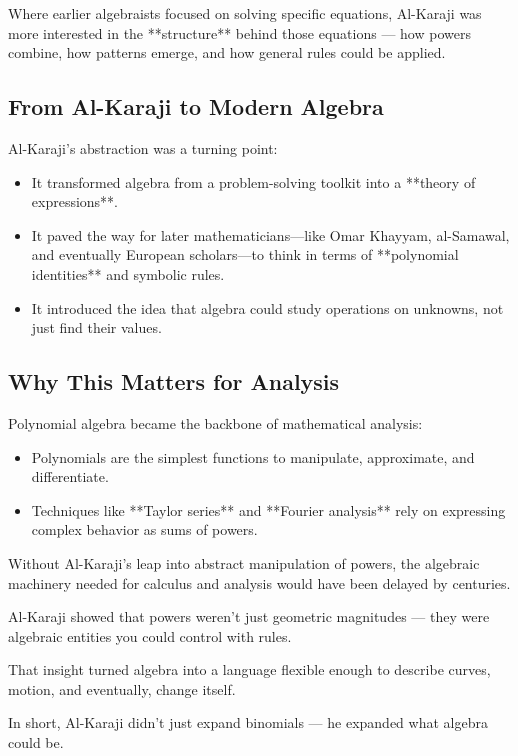 \begin{tcolorbox}[colback=blue!5!white, colframe=blue!50!black, title={Historical Sidebar: Al-Karaji and the Birth of Polynomial Algebra}, breakable]
    Where earlier algebraists focused on solving specific equations, Al-Karaji was more interested in the **structure** behind those equations — how powers combine, how patterns emerge, and how general rules could be applied.
    
    \subsection*{From Al-Karaji to Modern Algebra}
    
    Al-Karaji’s abstraction was a turning point:
    
    \begin{itemize}
      \item It transformed algebra from a problem-solving toolkit into a **theory of expressions**.
      \item It paved the way for later mathematicians—like Omar Khayyam, al-Samawal, and eventually European scholars—to think in terms of **polynomial identities** and symbolic rules.
      \item It introduced the idea that algebra could study operations on unknowns, not just find their values.
    \end{itemize}
    
    \subsection*{Why This Matters for Analysis}
    
    Polynomial algebra became the backbone of mathematical analysis:
    
    \begin{itemize}
      \item Polynomials are the simplest functions to manipulate, approximate, and differentiate.
      \item Techniques like **Taylor series** and **Fourier analysis** rely on expressing complex behavior as sums of powers.
    \end{itemize}
    
    Without Al-Karaji’s leap into abstract manipulation of powers, the algebraic machinery needed for calculus and analysis would have been delayed by centuries.
    
    \begin{tcolorbox}[colback=gray!10, colframe=black, title={From Al-Karaji’s Powers to Newton’s Calculus}, fonttitle=\bfseries]
    Al-Karaji showed that powers weren’t just geometric magnitudes — they were algebraic entities you could control with rules.
    
    That insight turned algebra into a language flexible enough to describe curves, motion, and eventually, change itself.
    \end{tcolorbox}
    
    In short, Al-Karaji didn’t just expand binomials — he expanded what algebra could be.
    
\end{tcolorbox}


